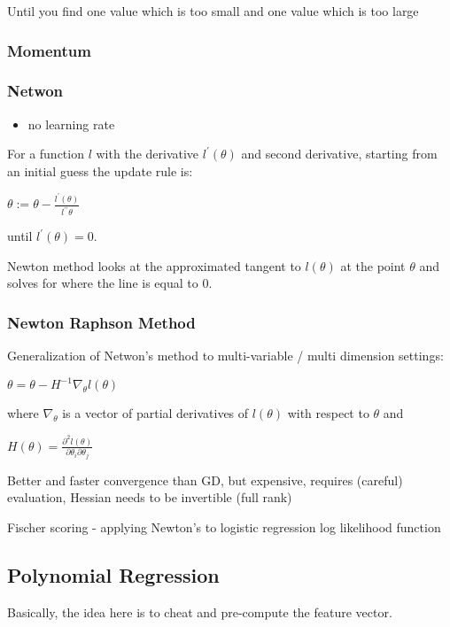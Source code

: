 {{{Until you find one value which is too small and one value which is too large

\subsubsection{Momentum}

\subsubsection{Netwon}

\begin{itemize}
\item no learning rate
\end{itemize}

For a function $l$ with the derivative $l^\prime(\theta)$ and second derivative, starting from an initial guess the update rule is:

$\theta := \theta - \frac{l^\prime(\theta)}{l^{\prime\prime}\theta}$

until $l^\prime(\theta)=0$. 

Newton method looks at the approximated tangent to $l(\theta)$ at the point $\theta$ and solves for where the line is equal to 0.

\subsubsection{Newton Raphson Method}

Generalization of Netwon's method to multi-variable / multi dimension settings:

$\theta = \theta - H^{-1}\nabla_\theta l(\theta)$

where $\nabla_\theta$ is a vector of partial derivatives of $l(\theta)$ with respect to $\theta$ and 

$H(\theta)=\frac{\partial^2 l(\theta)}{\partial \theta_i\partial\theta_j}$

Better and faster convergence than GD, but expensive, requires (careful) evaluation, Hessian needs to be invertible (full rank)

Fischer scoring - applying Newton's to logistic regression log likelihood function

\subsection{Polynomial Regression}

Basically, the idea here is to cheat and pre-compute the feature vector. 

}}}
